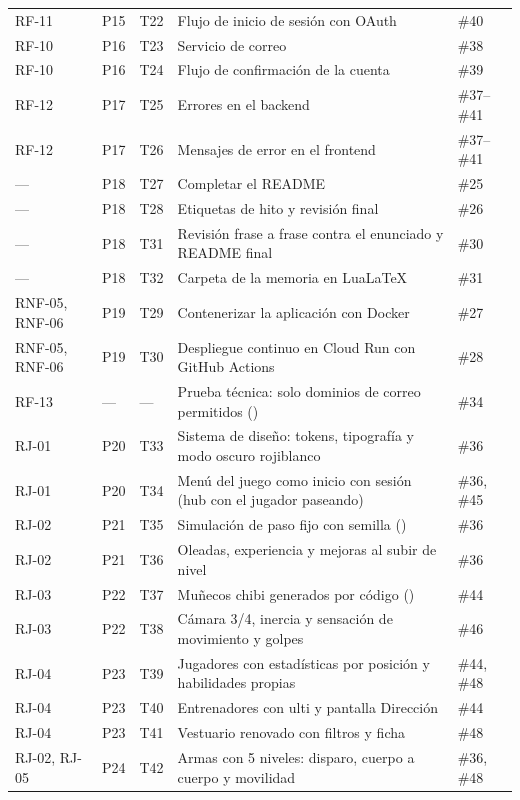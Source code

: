 {\begin{longtable}{@{}L{1.4cm} L{0.7cm} L{1.2cm} L{6.8cm} L{3.2cm}@{}}
RF-11 & P15 & T22 & Flujo de inicio de sesión con OAuth & \#40 \\
RF-10 & P16 & T23 & Servicio de correo & \#38 \\
RF-10 & P16 & T24 & Flujo de confirmación de la cuenta & \#39 \\
RF-12 & P17 & T25 & Errores en el backend & \#37--\#41 \\
RF-12 & P17 & T26 & Mensajes de error en el frontend & \#37--\#41 \\
— & P18 & T27 & Completar el README & \#25 \\
— & P18 & T28 & Etiquetas de hito y revisión final & \#26 \\
— & P18 & T31 & Revisión frase a frase contra el enunciado y README final & \#30 \\
— & P18 & T32 & Carpeta de la memoria en LuaLaTeX & \#31 \\
RNF-05, RNF-06 & P19 & T29 & Contenerizar la aplicación con Docker & \#27 \\
RNF-05, RNF-06 & P19 & T30 & Despliegue continuo en Cloud Run con GitHub Actions & \#28 \\
RF-13 & — & — & Prueba técnica: solo dominios de correo permitidos () & \#34 \\
RJ-01 & P20 & T33 & Sistema de diseño: tokens, tipografía y modo oscuro rojiblanco & \#36 \\
RJ-01 & P20 & T34 & Menú del juego como inicio con sesión (hub con el jugador paseando) & \#36, \#45 \\
RJ-02 & P21 & T35 & Simulación de paso fijo con semilla () & \#36 \\
RJ-02 & P21 & T36 & Oleadas, experiencia y mejoras al subir de nivel & \#36 \\
RJ-03 & P22 & T37 & Muñecos chibi generados por código () & \#44 \\
RJ-03 & P22 & T38 & Cámara 3/4, inercia y sensación de movimiento y golpes & \#46 \\
RJ-04 & P23 & T39 & Jugadores con estadísticas por posición y habilidades propias & \#44, \#48 \\
RJ-04 & P23 & T40 & Entrenadores con ulti y pantalla Dirección & \#44 \\
RJ-04 & P23 & T41 & Vestuario renovado con filtros y ficha & \#48 \\
RJ-02, RJ-05 & P24 & T42 & Armas con 5 niveles: disparo, cuerpo a cuerpo y movilidad & \#36, \#48 \\

\end{longtable}}
